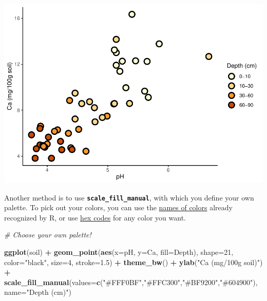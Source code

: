 \documentclass[
]{article}
\newenvironment{Shaded}{\begin{snugshade}}{\end{snugshade}}
\newcommand{\AttributeTok}[1]{\textcolor[rgb]{0.13,0.29,0.53}{#1}}
\newcommand{\CommentTok}[1]{\textcolor[rgb]{0.56,0.35,0.01}{\textit{#1}}}
\newcommand{\DecValTok}[1]{\textcolor[rgb]{0.00,0.00,0.81}{#1}}
\newcommand{\FloatTok}[1]{\textcolor[rgb]{0.00,0.00,0.81}{#1}}
\newcommand{\FunctionTok}[1]{\textcolor[rgb]{0.13,0.29,0.53}{\textbf{#1}}}
\newcommand{\NormalTok}[1]{#1}
\newcommand{\SpecialCharTok}[1]{\textcolor[rgb]{0.81,0.36,0.00}{\textbf{#1}}}
\newcommand{\StringTok}[1]{\textcolor[rgb]{0.31,0.60,0.02}{#1}}
\begin{document}
\includegraphics{module1_3_files/figure-latex/unnamed-chunk-34-1.pdf}

Another method is to use \textbf{\texttt{scale\_fill\_manual}}, with
which you define your own palette. To pick out your colors, you can use
the
\href{\textquotesingle{}http://www.stat.columbia.edu/~tzheng/files/Rcolor.pdf}{names
of colors} already recognized by R, or use
\href{https://htmlcolorcodes.com/}{hex codes} for any color you want.

\begin{Shaded}
\begin{Highlighting}[]
\CommentTok{\# Choose your own palette!}

\FunctionTok{ggplot}\NormalTok{(soil) }\SpecialCharTok{+}
  \FunctionTok{geom\_point}\NormalTok{(}\FunctionTok{aes}\NormalTok{(}\AttributeTok{x=}\NormalTok{pH, }\AttributeTok{y=}\NormalTok{Ca, }\AttributeTok{fill=}\NormalTok{Depth), }\AttributeTok{shape=}\DecValTok{21}\NormalTok{, }\AttributeTok{color=}\StringTok{"black"}\NormalTok{, }\AttributeTok{size=}\DecValTok{4}\NormalTok{, }\AttributeTok{stroke=}\FloatTok{1.5}\NormalTok{) }\SpecialCharTok{+}
  \FunctionTok{theme\_bw}\NormalTok{() }\SpecialCharTok{+}
  \FunctionTok{ylab}\NormalTok{(}\StringTok{"Ca (mg/100g soil)"}\NormalTok{) }\SpecialCharTok{+}
  \FunctionTok{scale\_fill\_manual}\NormalTok{(}\AttributeTok{values=}\FunctionTok{c}\NormalTok{(}\StringTok{"\#FFF0BF"}\NormalTok{,}\StringTok{"\#FFC300"}\NormalTok{,}\StringTok{"\#BF9200"}\NormalTok{,}\StringTok{"\#604900"}\NormalTok{), }\AttributeTok{name=}\StringTok{"Depth (cm)"}\NormalTok{)}
\end{Highlighting}
\end{Shaded}
\end{document}

